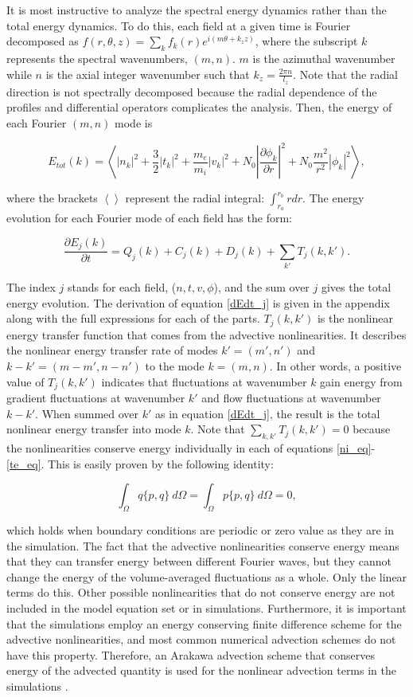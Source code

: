 \documentclass[12pt]{article}
\def\beq{\begin{equation}}
\def\eeq{\end{equation}}
\newcommand{\pdiff}[2]{\frac{\partial#1}{\partial#2}}
\begin{document}
It is most instructive to analyze the spectral energy dynamics rather than the total energy dynamics. To do this, each field at a given time is Fourier decomposed as 
$f(r,\theta,z) = \sum_k f_k(r) e^{i (m \theta + k_z z )}$,
where the subscript $k$ represents the spectral wavenumbers, $(m,n)$. $m$ is the azimuthal wavenumber while $n$ is the axial integer wavenumber such that $k_z = \frac{2 \pi n}{l_z}$. Note that
the radial direction is not spectrally decomposed because the radial dependence of the profiles and differential operators complicates the analysis.
Then, the energy of each Fourier $(m,n)$ mode is

\beq
\label{E_k}
E_{tot}(k) = \left< |n_k|^2 + \frac{3}{2} |t_k|^2 + \frac{m_e}{m_i} |v_k|^2 + N_0 \left| \pdiff{\phi_k}{r} \right|^2 + N_0 \frac{m^2}{r^2} |\phi_k|^2 \right>,
\eeq

where the brackets $\left< \right>$ represent the radial integral: $\int_{r_a}^{r_b} r dr$.
The energy evolution for each Fourier mode of each field has the form:

\beq
\label{dEdt_j}
\pdiff{E_{j}(k)}{t} = Q_{j}(k) + C_{j}(k) + D_j(k) + \sum_{k'} T_{j}(k,k').
\eeq

The index $j$ stands for each field, ($n,t,v,\phi$), and the sum over $j$ gives the total energy evolution. The derivation of equation \ref{dEdt_j} 
is given in the appendix along with the full expressions for each of the parts. $T_{j}(k,k')$ is the nonlinear energy transfer function that comes from the advective
nonlinearities.  It describes the nonlinear energy transfer rate of modes $k'=(m',n')$ and $k-k'=(m-m',n-n')$ to the mode $k=(m,n)$. 
In other words, a positive value of $T_{j}(k,k')$ indicates that fluctuations
at wavenumber $k$ gain energy from gradient fluctuations at wavenumber $k'$ and flow fluctuations at wavenumber $k-k'$.
When summed over $k'$ as in equation \ref{dEdt_j}, the result is the total
nonlinear energy transfer into mode $k$. Note that $\sum_{k,k'} T_{j}(k,k') = 0$ because the nonlinearities conserve energy individually in each of equations \ref{ni_eq}-\ref{te_eq}.
This is easily proven by the following identity:

\beq
\label{poisson_rln}
\int_\Omega q \{p,q\} \ d\Omega = \int_\Omega p \{p,q\} \ d\Omega = 0,
\eeq

which holds when boundary conditions are periodic or zero value as they are in the simulation. 
The fact that the advective nonlinearities conserve energy means that they can transfer energy between different Fourier waves,
but they cannot change the energy of the volume-averaged fluctuations as a whole. Only the linear terms do this.
Other possible nonlinearities that do not conserve energy are not included in the model equation set or in simulations. 
Furthermore, it is important that the simulations employ an energy conserving finite difference
scheme for the advective nonlinearities, and most common numerical advection schemes do not have this property. Therefore, an Arakawa advection scheme that conserves 
energy of the advected quantity is used for the nonlinear advection terms in the simulations \cite{arakawa1966}. \\
\end{document}
